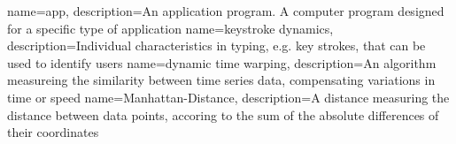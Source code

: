 {
  name=app,
  description={An application program. A computer program designed for a specific type of application}
}
{
  name=keystroke dynamics,
  description={Individual characteristics in typing, e.g. key strokes, that can be used to identify users}
}
{
  name=dynamic time warping,
  description={An algorithm measureing the similarity between time series data, compensating variations in time or speed}
}
{
  name=Manhattan-Distance,
  description={A distance measuring the distance between data points, accoring to the sum of the absolute differences of their coordinates}
}